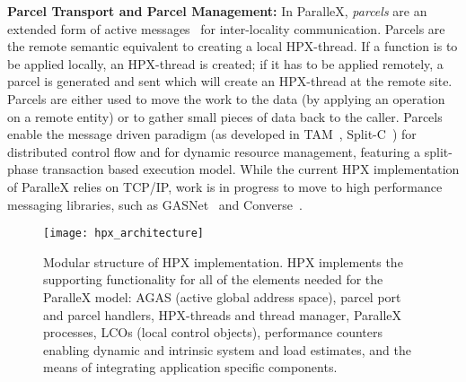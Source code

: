\documentclass{revtex4}
\newcommand{\I}[1]{\textit{#1}}
\newcommand{\B}[1]{\textbf{#1}}
\begin{document}
\B{Parcel Transport and Parcel Management:} In ParalleX, \I{parcels} are an extended
form of active messages~\cite{Wall:1982:MAA:582153.582157} for inter-locality communication.
Parcels are the remote
semantic equivalent to creating a local HPX-thread. If a function is to be
applied locally, an HPX-thread is created; if it has to be applied remotely, a
parcel is generated and sent which will create an HPX-thread at the remote site.
Parcels are either used to move the work to the data (by applying an operation
on a remote entity) or to gather small pieces of data back to the caller.
Parcels enable the message driven paradigm (as developed in TAM~\cite{Culler93acompiler},
Split-C~\cite{citeulike:7729323}) for distributed control flow and for dynamic
resource management, featuring a split-phase transaction based execution model.
While the current HPX implementation of ParalleX relies on TCP/IP, 
work is in progress to move to high performance messaging libraries, such 
as GASNet~\cite{gasnetspec} and
Converse~\cite{converse}.

\begin{figure} \texttt{[image: hpx\_architecture]}
  \caption{\small{Modular structure of HPX implementation. HPX implements the supporting
     functionality for all of the elements needed for the ParalleX
     model: AGAS (active global address space), parcel port and
     parcel handlers, HPX-threads and thread manager, ParalleX processes, LCOs (local control objects),
     performance counters enabling dynamic and intrinsic system and load
    estimates, and the means of integrating application specific components.}
  }
\label{fig:hpxarch}
\end{figure}
\end{document}
